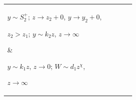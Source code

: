 \begin{center}
\begin{tabular}{|p{0.7cm}|p{3.4cm}|p{3.4cm}|p{3.4cm}|p{3.4cm}|}
\parbox{3.3cm}{$y\sim S^+_2$; $z\to z_2+0$, $y\to y_2+0$, 


$z_2>z_1$; $y\sim k_2z$, $z\to\infty$} & 


\parbox{3.3cm}{$y\sim k_1z$, $z\to0$; $W\sim d_1z^\chi$, 


$z\to\infty$} \\ 


\hline 


$M_1$ & \parbox{3.3cm}{$y\sim k_1z$, $z\to0$; 


$y\sim R^+_0(d_2)$, $z\to z_0+0$, $y\to y_0+0$, $z_0<z_1$} & 


\parbox{3.3cm}{} & \parbox{3.3cm}{} & 


\parbox{3.3cm}{$y\sim k_1z$, $z\to0$; 


$y\sim Az^\zeta$, $z\to0$, $A>0$} \\ 


\hline 


$M_2$ & \parbox{3.3cm}{$y\sim R^+_0(d_2)$, 


$z\to z_0+0$, $y\to y_0+0$, $z_1<z_0<z_2$; \\


$y\sim Az^\zeta$, $z\to0$,\\ $A=A(z_0)>0$} & 


\parbox{3.3cm}{$y\sim R^+_0(d_2)$, $z\to z_0+0$, 


$y\to y_0+0$, $0<z_0<z_2$;\\ $y\sim Az^\zeta$, $z\to0$,\\


$A=A(z_0)>0$} & \parbox{3.3cm}{$y\sim S^+_0$, 


$z\to z_0+0$, $y\to y_0{+}0$, $0{<}z_0{<}z_2$; 


$y\sim Az^\zeta$, $z\to0$,\\ $A=A(z_0)>0$} & 


\parbox{3.3cm}{$y\sim k_1z$, $z\to0$; 


$W{\sim} Dz^{1/\chi}$, $z{\to}\infty$, $D>0$}\\ 


\hline 


$M_3$ & \parbox{3.3cm}{$y\sim R^+_0(d_2)$, 


$z\to z_0{+}0$, $y{\to} y_0{+}0$,\\ $z_0{>}z_2$; 


$W\sim Dz^{1/\chi}$, $z\to\infty$,\\ $D=D(z_0)>0$} & 


\parbox{3.3cm}{$y\sim R^+_0(d_2)$, $z\to z_0{+}0$, 


$y{\to} y_0{+}0$,\\ $z_0{>}z_2$; $W\sim Dz^{1/\chi}$, \\


}
\end{tabular}
\end{center}
